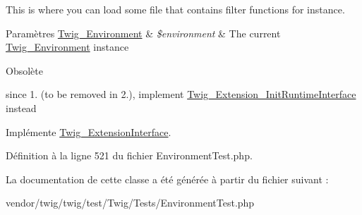 This is where you can load some file that contains filter functions for instance.


\begin{DoxyParams}[1]{Paramètres}
\hyperlink{class_twig___environment}{Twig\+\_\+\+Environment} & {\em \$environment} & The current \hyperlink{class_twig___environment}{Twig\+\_\+\+Environment} instance\\
\hline
\end{DoxyParams}
\begin{DoxyRefDesc}{Obsolète}
\item[\hyperlink{deprecated__deprecated000015}{Obsolète}]since 1. (to be removed in 2.), implement \hyperlink{interface_twig___extension___init_runtime_interface}{Twig\+\_\+\+Extension\+\_\+\+Init\+Runtime\+Interface} instead \end{DoxyRefDesc}


Implémente \hyperlink{interface_twig___extension_interface_ab17a2e5ce3e5789febe1f3a96e61ec38}{Twig\+\_\+\+Extension\+Interface}.



Définition à la ligne 521 du fichier Environment\+Test.\+php.



La documentation de cette classe a été générée à partir du fichier suivant \+:\begin{DoxyCompactItemize}
\item 
vendor/twig/twig/test/\+Twig/\+Tests/Environment\+Test.\+php\end{DoxyCompactItemize}
